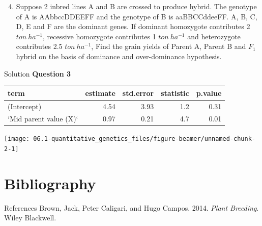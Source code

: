 \documentclass[11pt,dvipsnames,ignorenonframetext,aspectratio=169]{beamer}
\providecommand{\tightlist}{%
  \setlength{\itemsep}{0pt}\setlength{\parskip}{0pt}}
\newlength{\cslhangindent}
\newenvironment{cslreferences}%
    {\setlength{\parindent}{0pt}%
    \everypar{\setlength{\hangindent}{\cslhangindent}}\ignorespaces}%
    {\par}
\begin{document}
\begin{frame}{}
\protect\hypertarget{section-23}{}
\begin{enumerate}
\setcounter{enumi}{3}
\tightlist
\item
  Suppose 2 inbred lines A and B are crossed to produce hybrid. The
  genotype of A is AAbbccDDEEFF and the genotype of B is aaBBCCddeeFF.
  A, B, C, D, E and F are the dominant genes. If dominant homozygote
  contributes 2 \(ton~ha^{-1}\), recessive homozygote contributes 1
  \(ton~ha^{-1}\) and heterozygote contributes 2.5 \(ton~ha^{-1}\), Find
  the grain yields of Parent A, Parent B and \(F_1\) hybrid on the basis
  of dominance and over-dominance hypothesis.
\end{enumerate}
\end{frame}

\begin{frame}{Solution}
\protect\hypertarget{solution-3}{}
\textbf{Question 3}

\begin{tabular}{lrrrr}
\toprule
term & estimate & std.error & statistic & p.value\\
\midrule
(Intercept) & 4.54 & 3.93 & 1.2 & 0.31\\
`Mid parent value (X)` & 0.97 & 0.21 & 4.7 & 0.01\\
\bottomrule
\end{tabular}

\texttt{[image: 06.1-quantitative\_genetics\_files/figure-beamer/unnamed-chunk-2-1]}
\end{frame}

\hypertarget{bibliography}{%
\section{Bibliography}\label{bibliography}}

\begin{frame}{References}
\protect\hypertarget{references}{}
\hypertarget{refs}{}
\begin{cslreferences}
\leavevmode\hypertarget{ref-brown2014plantbreeding}{}%
Brown, Jack, Peter Caligari, and Hugo Campos. 2014. \emph{Plant
Breeding}. Wiley Blackwell.
\end{cslreferences}
\end{frame}
\end{document}
